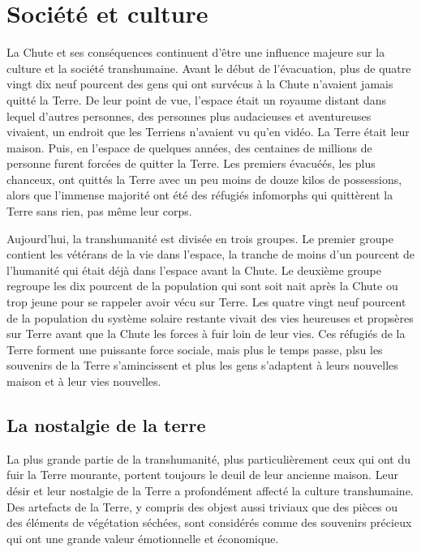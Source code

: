 \section{Société et culture} \label{sec:culture-society} 

La Chute et ses conséquences continuent d'être une influence majeure sur la culture et la société transhumaine. Avant le début de l'évacuation, plus de quatre vingt dix neuf pourcent des gens qui ont survécus à la Chute n'avaient jamais quitté la Terre. De leur point de vue, l'espace était un royaume distant dans lequel d'autres personnes, des personnes plus audacieuses et aventureuses vivaient, un endroit que les Terriens n'avaient vu qu'en vidéo. La Terre était leur maison. Puis, en l'espace de quelques années, des centaines de millions de personne furent forcées de quitter la Terre. Les premiers évacuéés, les plus chanceux, ont quittés la Terre avec un peu moins de douze kilos de possessions, alors que l'immense majorité ont été des réfugiés infomorphs qui quittèrent la Terre sans rien, pas même leur corps. 

Aujourd'hui, la transhumanité est divisée en trois groupes. Le premier groupe contient les vétérans de la vie dans l'espace, la tranche de moins d'un pourcent de l'humanité qui était déjà dans l'espace avant la Chute. Le deuxième groupe regroupe les dix pourcent de la population qui sont soit nait après la Chute ou trop jeune pour se rappeler avoir vécu sur Terre. Les quatre vingt neuf pourcent de la population du système solaire restante vivait des vies heureuses et propsères sur Terre avant que la Chute les forces à fuir loin de leur vies. Ces réfugiés de la Terre forment une puissante force sociale, mais plus le temps passe, plsu les souvenirs de la Terre s'amincissent et plus les gens s'adaptent à leurs nouvelles maison et à leur vies nouvelles. 

\subsection{La nostalgie de la terre} \label{sec:longing-earth} 

La plus grande partie de la transhumanité, plus particulièrement ceux qui ont du fuir la Terre mourante, portent toujours le deuil de leur ancienne maison. Leur désir et leur nostalgie de la Terre a profondément affecté la culture transhumaine. Des artefacts de la Terre, y compris des objest aussi triviaux que des pièces ou des éléments de végétation séchées, sont considérés comme des souvenirs précieux qui ont une grande valeur émotionnelle et économique. 

